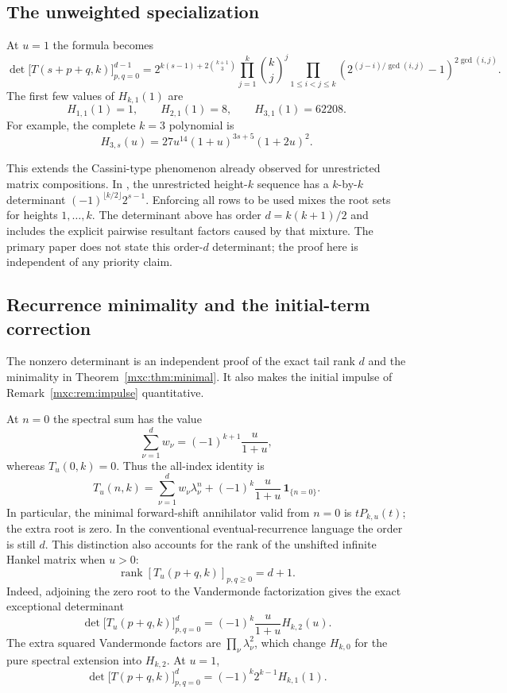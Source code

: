 \documentclass[11pt]{article}
\numberwithin{equation}{section}
\theoremstyle{definition}
\theoremstyle{remark}
\begin{document}
\subsection{The unweighted specialization}

At $u=1$ the formula becomes
\begin{equation}
 \det\bigl[T(s+p+q,k)\bigr]_{p,q=0}^{d-1}
 =2^{k(s-1)+2\binom{k+1}{3}}
  \prod_{j=1}^{k}\binom{k}{j}^{j}
  \prod_{1\leq i<j\leq k}
  \left(2^{(j-i)/\gcd(i,j)}-1\right)^{2\gcd(i,j)}.
 \label{mxc:eq:unweighted-hankel-product}
\end{equation}
The first few values of $H_{k,1}(1)$ are
\[
 H_{1,1}(1)=1,\qquad H_{2,1}(1)=8,\qquad H_{3,1}(1)=62208.
\]
For example, the complete $k=3$ polynomial is
\[
 H_{3,s}(u)=27u^{14}(1+u)^{3s+5}(1+2u)^2.
\]

This extends the Cassini-type phenomenon already observed for
unrestricted matrix compositions.  In \cite[Proposition~21]{mpr2009},
the unrestricted height-$k$ sequence has a $k$-by-$k$ determinant
$(-1)^{\lfloor k/2\rfloor}2^{s-1}$.  Enforcing all rows to be used
mixes the root sets for heights $1,\ldots,k$.  The determinant above
has order $d=k(k+1)/2$ and includes the explicit pairwise resultant
factors caused by that mixture.  The primary paper does not state
this order-$d$ determinant; the proof here is independent of any
priority claim.

\subsection{Recurrence minimality and the initial-term correction}

The nonzero determinant is an independent proof of the exact tail
rank $d$ and the minimality in Theorem~\ref{mxc:thm:minimal}. It also makes
the initial impulse of Remark~\ref{mxc:rem:impulse} quantitative.

At $n=0$ the spectral sum has the value
\[
 \sum_{\nu=1}^{d}w_\nu=(-1)^{k+1}\frac{u}{1+u},
\]
whereas $T_u(0,k)=0$.  Thus the all-index identity is
\begin{equation}
 T_u(n,k)=\sum_{\nu=1}^{d}w_\nu\lambda_\nu^n
 +(-1)^k\frac{u}{1+u}\,\mathbf1_{\{n=0\}}.
 \label{mxc:eq:weighted-hankel-zero-correction}
\end{equation}
In particular, the minimal forward-shift annihilator valid from
$n=0$ is $tP_{k,u}(t)$; the extra root is zero.  In the conventional
eventual-recurrence language the order is still $d$.  This distinction
also accounts for the rank of the unshifted infinite Hankel matrix
when $u>0$:
\[
 \operatorname{rank}[T_u(p+q,k)]_{p,q\geq0}=d+1.
\]
Indeed, adjoining the zero root to the Vandermonde factorization
gives the exact exceptional determinant
\begin{equation}
 \det\bigl[T_u(p+q,k)\bigr]_{p,q=0}^{d}
 =(-1)^k\frac{u}{1+u}H_{k,2}(u).
 \label{mxc:eq:weighted-hankel-initial-determinant}
\end{equation}
The extra squared Vandermonde factors are
$\prod_\nu\lambda_\nu^2$, which change $H_{k,0}$ for the pure
spectral extension into $H_{k,2}$.  At $u=1$,
\[
 \det\bigl[T(p+q,k)\bigr]_{p,q=0}^{d}
 =(-1)^k2^{k-1}H_{k,1}(1).
\]
\end{document}
